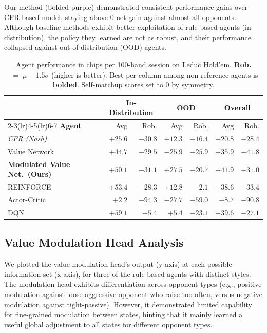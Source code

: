 \documentclass{article}
\begin{document}
Our method (bolded purple) demonstrated consistent performance gains over CFR-based model, staying above 0 net-gain against almost all opponents. Although baseline methods exhibit better exploitation of rule-based agents (in-distribution), the policy they learned are not as robust, and their performance collapsed against out-of-distribution (OOD) agents.

\begin{table}[t]
\centering
\caption{Agent performance in chips per 100-hand session on Leduc Hold'em.
\textbf{Rob.}$\;{=}\;\mu - 1.5\sigma$ (higher is better).
Best per column among non-reference agents is \textbf{bolded}.
Self-matchup scores set to 0 by symmetry.}
\label{tab:main}
\setlength{\tabcolsep}{5pt}
\begin{tabular}{l rr rr rr}
\toprule
& \multicolumn{2}{c}{In-Distribution} & \multicolumn{2}{c}{OOD} & \multicolumn{2}{c}{Overall} \\
\cmidrule(lr){2-3}\cmidrule(lr){4-5}\cmidrule(lr){6-7}
\textbf{Agent} & Avg & Rob. & Avg & Rob. & Avg & Rob. \\
\midrule
\textit{CFR (Nash)} & $+25.6$ & $-30.8$ & $+12.3$ & $-16.4$ & $+20.8$ & $-28.4$ \\
\midrule
Value Network & $+44.7$ & $-29.5$ & $-25.9$ & $-25.9$ & $+35.9$ & $-41.8$ \\
\textbf{Modulated Value Net.\ (Ours)} & $+50.1$ & $-31.1$ & $\mathbf{+27.5}$ & $-20.7$ & $\mathbf{+41.9}$ & $-31.0$ \\
REINFORCE & $+53.4$ & $-28.3$ & $+12.8$ & $\mathbf{-2.1}$ & $+38.6$ & $-33.4$ \\
Actor-Critic & $+2.2$ & $-94.3$ & $-27.7$ & $-59.0$ & $-8.7$ & $-90.8$ \\
DQN & $\mathbf{+59.1}$ & $\mathbf{-5.4}$ & $+5.4$ & $-23.1$ & $+39.6$ & $\mathbf{-27.1}$ \\
\bottomrule
\end{tabular}
\end{table}

\subsection{Value Modulation Head Analysis}

We plotted the value modulation head's output (y-axis) at each possible information set (x-axis), for three of the rule-based agents with distinct styles. The modulation head exhibits differentiation across opponent types (e.g., positive modulation against loose-aggressive opponent who raise too often, versus negative modulation against tight-passive). However, it demonstrated limited capability for fine-grained modulation between states, hinting that it mainly learned a useful global adjustment to all states for different opponent types.
\end{document}
